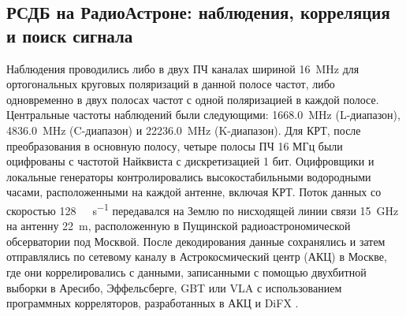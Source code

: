 \subsection{РСДБ на РадиоАстроне: наблюдения, корреляция и поиск сигнала}

Наблюдения проводились либо в двух ПЧ каналах шириной \SI{16}{\MHz} для ортогональных круговых
поляризаций в данной полосе частот, либо одновременно в двух полосах частот с одной поляризацией в
каждой полосе. Центральные частоты наблюдений были следующими: \SI{1668.0}{\MHz} (L-диапазон),
\SI{4836.0}{\MHz} (C-диапазон) и \SI{22236.0}{\MHz} (K-диапазон). Для КРТ, после преобразования в
основную полосу, четыре полосы ПЧ 16 МГц были оцифрованы с частотой Найквиста с дискретизацией 1
бит. Оцифровщики и локальные генераторы контролировались высокостабильными водородными часами,
расположенными на каждой антенне, включая КРТ. Поток данных со скоростью
\SI{128}{\mega\bit\per\second} передавался на Землю по нисходящей линии связи \SI{15}{\GHz} на
антенну \SI{22}{\meter}, расположенную в Пущинской радиоастрономической обсерватории под Москвой.
После декодирования данные сохранялись и затем отправлялись по сетевому каналу в Астрокосмический
центр (АКЦ) в Москве, где они коррелировались с данными, записанными с помощью двухбитной выборки в
Аресибо, Эффельсберге, GBT или VLA с использованием  программных корреляторов, разработанных в АКЦ
\cite{Kardashev_2013_rus} и DiFX \cite{Deller_2011,Bruni_2014}.


